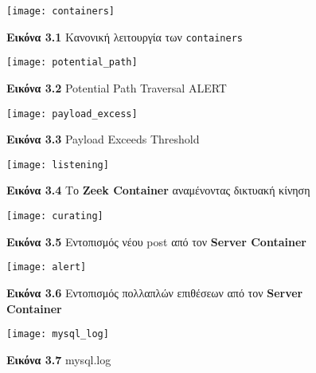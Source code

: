\begin{figure}[H]
\centering
\texttt{[image: containers]}
\caption*{\small{\textbf{Εικόνα 3.1} Κανονική λειτουργία των \texttt{containers}}}
\end{figure}

\begin{figure}[H]
\centering
\texttt{[image: potential\_path]}
\caption*{\small{\textbf{Εικόνα 3.2} Potential Path Traversal ALERT}}  %
\end{figure}

\begin{figure}[H]
\centering
\texttt{[image: payload\_excess]}
\caption*{\small{\textbf{Εικόνα 3.3} Payload Exceeds Threshold}}
\end{figure}

\begin{figure}[H]
\centering
\texttt{[image: listening]}
\caption*{\small{\textbf{Εικόνα 3.4} Το \textbf{Zeek Container} αναμένοντας δικτυακή κίνηση}}
\end{figure}

\begin{figure}[H]
\centering
\texttt{[image: curating]}
\caption*{\small{\textbf{Εικόνα 3.5} Εντοπισμός νέου post από τον \textbf{Server Container}}}
\end{figure}

\begin{figure}[H]
\centering
\texttt{[image: alert]}
\caption*{\small{\textbf{Εικόνα 3.6} Εντοπισμός πολλαπλών επιθέσεων από τον \textbf{Server Container}}}
\end{figure}

\begin{figure}[H]
\centering
\texttt{[image: mysql\_log]}
\caption*{\small{\textbf{Εικόνα 3.7} mysql.log}}
\end{figure}